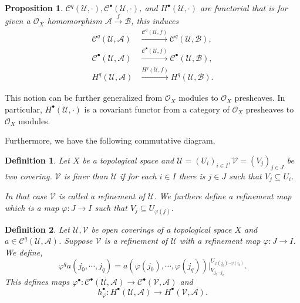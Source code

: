 \documentclass{article}
\newtheorem{proposition}{Proposition}[section]
\newtheorem{definition}{Definition}[section]
\newcommand{\cA}[0]{\mathcal{A}}
\newcommand{\cB}[0]{\mathcal{B}}
\newcommand{\cC}[0]{\mathcal{C}}
\newcommand{\sU}[0]{\mathscr{U}}
\newcommand{\sV}[0]{\mathscr{V}}
\newcommand{\Ouv}[0]{\mathcal{O}}
\begin{document}
\begin{proposition}
  $\mathcal{C}^q(\mathscr{U},\cdot),\mathscr{C}^\bullet(\mathscr{U},\cdot)$, and $H^\bullet(\mathscr{U},\cdot)$ are functorial that is for given a $\Ouv_X$ homomorphism $\cA\stackrel{f}{\to}\cB$, this induces 
  \begin{align*}
    \mathcal{C}^q(\mathscr{U},\cA)& \stackrel{\mathcal{C}^q(\mathscr{U},f)}{\to}\mathcal{C}^q(\mathscr{U},\cB),\\
    \mathcal{C}^\bullet(\mathscr{U},\cA)& \stackrel{\mathscr{C}^\bullet(\mathscr{U},f)}{\to}\mathcal{C}^\bullet(\mathscr{U},\cB),\\
    H^q(\mathscr{U},\cA)& \stackrel{H^q(\mathscr{U},f)}{\to}H^q(\mathscr{U},\cB).
  \end{align*}
\end{proposition}

This notion can be further generalized from $\Ouv_X$ modules to $\Ouv_X$ presheaves. In particular, $H^\bullet(\mathscr{U},\cdot)$ is a covariant functor from a category of $\Ouv_X$ presheaves to $\Ouv_X$ modules.

Furthermore, we have the following commutative diagram,
\begin{center}
\end{center}
\begin{definition}
  Let $X$ be a topological space and $\mathscr{U}=(U_i)_{i\in I},\mathscr{V}=(V_j)_{j\in J}$ be two covering. $\mathscr{V}$ is finer than $\mathscr{U}$ if for each $i\in I$ there is $j\in J$ such that $V_j\subseteq U_i$. 
  \par In that case $\mathscr{V}$ is called a refinement of $\mathscr{U}$. We furthere define a refinement map which is a map $\varphi:J\to I$ such that $V_{j}\subseteq U_{\varphi(j)}$.
\end{definition}

\begin{definition}
  Let $\sU,\sV$ be open coverings of a topological space $X$ and $a\in\cC^q(\sU,\cA)$. Suppose $\sV$ is a refinement of $\sU$ with a refinement map $\varphi:J\to I$. We define,
  \begin{equation*}
    \varphi^qa(j_0,\cdots,j_q) = a(\varphi(j_0),\cdots,\varphi(j_q))|^{U_{\varphi(j_0) \cdots \varphi(i_q)}}_{V_{j_0 \cdots j_q}}.
  \end{equation*}
  This defines maps $\varphi^\bullet:\cC^\bullet(\sU,\cA)\to\cC^\bullet(\sV,\cA)$ and 
  \begin{equation*}
    h_\varphi^\bullet:H^\bullet(\sU,\cA)\to H^\bullet(\sV,\cA).
  \end{equation*}
\end{definition}
\end{document}
